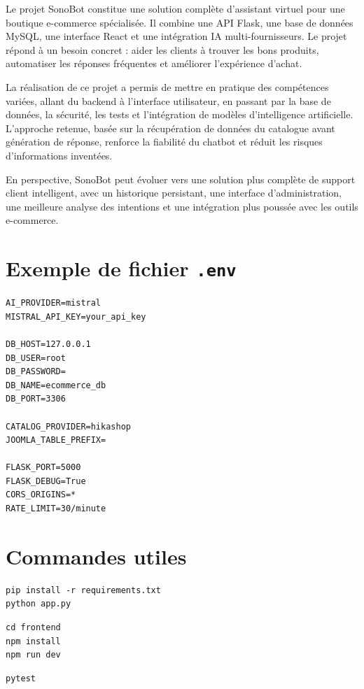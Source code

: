 \documentclass[12pt,a4paper]{report}
\begin{document}
Le projet SonoBot constitue une solution complète d'assistant virtuel pour une boutique e-commerce spécialisée. Il combine une API Flask, une base de données MySQL, une interface React et une intégration IA multi-fournisseurs. Le projet répond à un besoin concret : aider les clients à trouver les bons produits, automatiser les réponses fréquentes et améliorer l'expérience d'achat.

La réalisation de ce projet a permis de mettre en pratique des compétences variées, allant du backend à l'interface utilisateur, en passant par la base de données, la sécurité, les tests et l'intégration de modèles d'intelligence artificielle. L'approche retenue, basée sur la récupération de données du catalogue avant génération de réponse, renforce la fiabilité du chatbot et réduit les risques d'informations inventées.

En perspective, SonoBot peut évoluer vers une solution plus complète de support client intelligent, avec un historique persistant, une interface d'administration, une meilleure analyse des intentions et une intégration plus poussée avec les outils e-commerce.

\appendix

\chapter{Exemple de fichier \texttt{.env}}

\begin{lstlisting}[caption={Exemple de configuration}]
AI_PROVIDER=mistral
MISTRAL_API_KEY=your_api_key

DB_HOST=127.0.0.1
DB_USER=root
DB_PASSWORD=
DB_NAME=ecommerce_db
DB_PORT=3306

CATALOG_PROVIDER=hikashop
JOOMLA_TABLE_PREFIX=

FLASK_PORT=5000
FLASK_DEBUG=True
CORS_ORIGINS=*
RATE_LIMIT=30/minute
\end{lstlisting}

\chapter{Commandes utiles}

\begin{lstlisting}[caption={Installation et lancement du backend}]
pip install -r requirements.txt
python app.py
\end{lstlisting}

\begin{lstlisting}[caption={Installation et lancement du frontend}]
cd frontend
npm install
npm run dev
\end{lstlisting}

\begin{lstlisting}[caption={Exécution des tests}]
pytest
\end{lstlisting}
\end{document}
